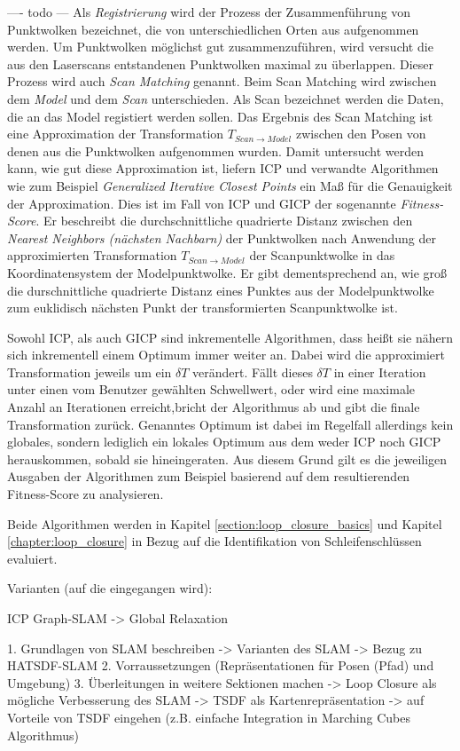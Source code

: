 ---- todo ---
Als \emph{Registrierung} wird der Prozess der Zusammenführung von Punktwolken bezeichnet, die von unterschiedlichen Orten aus aufgenommen werden. Um Punktwolken möglichst gut zusammenzuführen, wird versucht die aus den Laserscans entstandenen Punktwolken maximal zu überlappen. Dieser Prozess wird auch \emph{Scan Matching} genannt.
Beim Scan Matching wird zwischen dem \emph{Model} und dem \emph{Scan} unterschieden.
Als Scan bezeichnet werden die Daten, die an das Model registiert werden sollen.
Das Ergebnis des Scan Matching ist eine Approximation der Transformation $T_{Scan \rightarrow Model}$ zwischen den Posen von denen aus die Punktwolken aufgenommen wurden.
Damit untersucht werden kann, wie gut diese Approximation ist, liefern ICP und verwandte Algorithmen wie zum Beispiel \emph{Generalized Iterative Closest Points} \cite{segal2009generalized} ein Maß für die Genauigkeit der Approximation. Dies ist im Fall von ICP und GICP der sogenannte \emph{Fitness-Score}. Er beschreibt die durchschnittliche quadrierte Distanz zwischen den \emph{Nearest Neighbors (nächsten Nachbarn)} der Punktwolken nach Anwendung der approximierten Transformation $T_{Scan \rightarrow Model}$ der Scanpunktwolke in das Koordinatensystem der Modelpunktwolke.
Er gibt dementsprechend an, wie groß die durschnittliche quadrierte Distanz eines Punktes aus der Modelpunktwolke zum euklidisch nächsten Punkt der transformierten Scanpunktwolke ist.

Sowohl ICP, als auch GICP sind inkrementelle Algorithmen, dass heißt sie nähern sich inkrementell einem Optimum immer weiter an. Dabei wird die approximiert Transformation jeweils um ein $\delta T$ verändert. Fällt dieses $\delta T$ in einer Iteration unter einen vom Benutzer gewählten Schwellwert, oder wird eine maximale Anzahl an Iterationen erreicht,bricht der Algorithmus ab und gibt die finale Transformation zurück.
Genanntes Optimum ist dabei im Regelfall allerdings kein globales, sondern lediglich ein lokales Optimum aus dem weder ICP noch GICP herauskommen, sobald sie hineingeraten.
Aus diesem Grund gilt es die jeweiligen Ausgaben der Algorithmen zum Beispiel basierend auf dem resultierenden Fitness-Score zu analysieren. 

Beide Algorithmen werden in Kapitel \ref{section:loop_closure_basics} und Kapitel \ref{chapter:loop_closure} in Bezug auf die Identifikation von Schleifenschlüssen evaluiert.


Varianten (auf die eingegangen wird): 

ICP
Graph-SLAM -> Global Relaxation


 

1. Grundlagen von SLAM beschreiben
-> Varianten des SLAM
-> Bezug zu HATSDF-SLAM
2. Vorraussetzungen (Repräsentationen für Posen (Pfad) und Umgebung)
3. Überleitungen in weitere Sektionen machen
	-> Loop Closure als mögliche Verbesserung des SLAM
	-> TSDF als Kartenrepräsentation
		-> auf Vorteile von TSDF eingehen (z.B. einfache Integration in Marching Cubes Algorithmus)